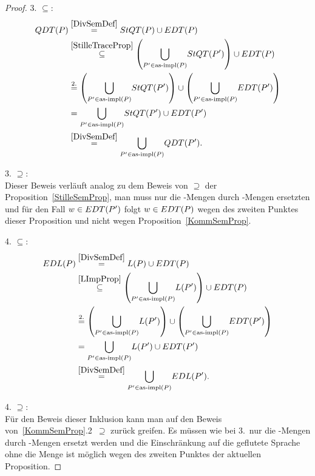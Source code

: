 \begin{proof}
  3. \glqq$\subseteq$\grqq{}:
  \begin{align*}
    QDT (P)&\overset{\ref{DivSemDef}}{=} StQT (P)\cup EDT (P)\\
    &\overset{\ref{StilleTraceProp}}{\subseteq} \left(\underset{P'\in \mathrm{as}\text{-}\mathrm{impl}
    (P)}{\bigcup} StQT (P')\right)\cup EDT (P)\\
    &\overset{2.}{=} \left(\underset{P'\in \mathrm{as}\text{-}\mathrm{impl} (P)}{\bigcup} StQT
    (P')\right)\cup \left(\underset{P'\in \mathrm{as}\text{-}\mathrm{impl} (P)}{\bigcup} EDT
    (P')\right)\\
    &= \underset{P'\in \mathrm{as}\text{-}\mathrm{impl} (P)}{\bigcup} StQT (P') \cup EDT (P')\\
    &\overset{\ref{DivSemDef}}{=} \underset{P'\in\mathrm{as}\text{-}\mathrm{impl} (P)}{\bigcup} QDT
    (P').\\
  \end{align*}

  3. \glqq$\supseteq$\grqq{}:\\
  Dieser Beweis verläuft analog zu dem Beweis von \glqq$\supseteq$\grqq{} der
  Proposition~\ref{StilleSemProp}, man muss nur die \ET{}-Mengen durch
  \EDT{}-Mengen ersetzten und für den Fall $w\in EDT (P')$ folgt $w\in EDT (P)$
  wegen des zweiten Punktes dieser Proposition und nicht wegen
  Proposition~\ref{KommSemProp}.

  4. \glqq$\subseteq$\grqq{}:
  {\allowdisplaybreaks
  \begin{align*}
    EDL (P)&\overset{\ref{DivSemDef}}{=} L (P)\cup EDT (P)\\
    &\overset{\ref{LImpProp}}{\subseteq} \left(\underset{P'\in \mathrm{as}\text{-}\mathrm{impl}
    (P)}{\bigcup} L (P')\right) \cup EDT (P)\\
    &\overset{2.}{=} \left(\underset{P'\in \mathrm{as}\text{-}\mathrm{impl} (P)}{\bigcup} L (P')\right)
    \cup \left(\underset{P'\in \mathrm{as}\text{-}\mathrm{impl} (P)}{\bigcup} EDT (P')\right)\\
    &= \underset{P'\in \mathrm{as}\text{-}\mathrm{impl} (P)}{\bigcup} L (P') \cup EDT (P')\\
    &\overset{\ref{DivSemDef}}{=} \underset{P'\in\mathrm{as}\text{-}\mathrm{impl} (P)}{\bigcup} EDL
    (P').\\
  \end{align*}}

  4. \glqq$\supseteq$\grqq{}:\\
  Für den Beweis dieser Inklusion kann man auf den Beweis
  von~\ref{KommSemProp}.2~\glqq$\supseteq$\grqq{} zurück greifen. Es müssen
  wie bei 3.\ nur die \ET{}-Mengen durch \EDT{}-Mengen ersetzt werden und die
  Einschränkung auf die geflutete Sprache ohne die Menge \EDT{} ist möglich
  wegen des zweiten Punktes der aktuellen Proposition.
\end{proof}

